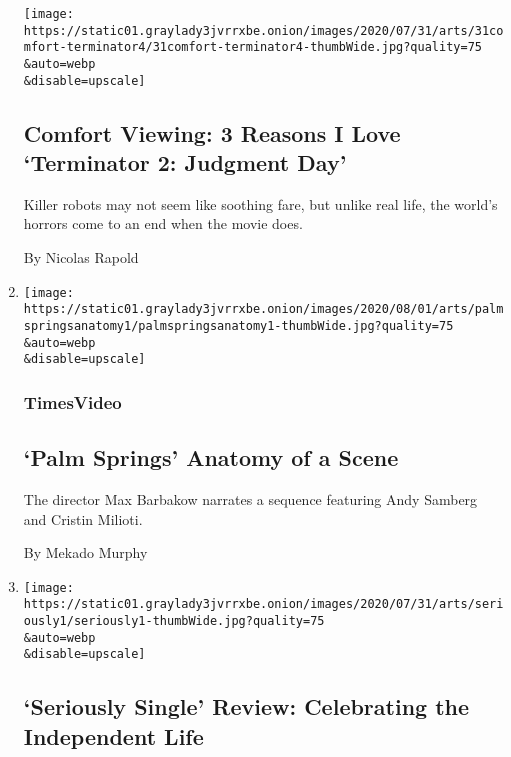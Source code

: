 \begin{enumerate}
  \texttt{[image: https://static01.graylady3jvrrxbe.onion/images/2020/07/31/arts/31comfort-terminator4/31comfort-terminator4-thumbWide.jpg?quality=75\\\&auto=webp\\\&disable=upscale]}

  \hypertarget{comfort-viewing-3-reasons-i-love-terminator-2-judgment-day}{%
  \subsection{Comfort Viewing: 3 Reasons I Love `Terminator 2: Judgment
  Day'}\label{comfort-viewing-3-reasons-i-love-terminator-2-judgment-day}}

  Killer robots may not seem like soothing fare, but unlike real life,
  the world's horrors come to an end when the movie does.

  By Nicolas Rapold
\item
  \href{/video/movies/100000007265338/palm-springs-scene.html}{}

  \texttt{[image: https://static01.graylady3jvrrxbe.onion/images/2020/08/01/arts/palmspringsanatomy1/palmspringsanatomy1-thumbWide.jpg?quality=75\\\&auto=webp\\\&disable=upscale]}

  \hypertarget{timesvideo}{%
  \subsubsection{TimesVideo}\label{timesvideo}}

  \hypertarget{palm-springs--anatomy-of-a-scene}{%
  \subsection{`Palm Springs' \textbar{} Anatomy of a
  Scene}\label{palm-springs--anatomy-of-a-scene}}

  The director Max Barbakow narrates a sequence featuring Andy Samberg
  and Cristin Milioti.

  By Mekado Murphy
\item
  \href{/2020/07/31/movies/seriously-single-review.html}{}

  \texttt{[image: https://static01.graylady3jvrrxbe.onion/images/2020/07/31/arts/seriously1/seriously1-thumbWide.jpg?quality=75\\\&auto=webp\\\&disable=upscale]}

  \hypertarget{seriously-single-review-celebrating-the-independent-life}{%
  \subsection{`Seriously Single' Review: Celebrating the Independent
  Life}\label{seriously-single-review-celebrating-the-independent-life}}


\end{enumerate}
